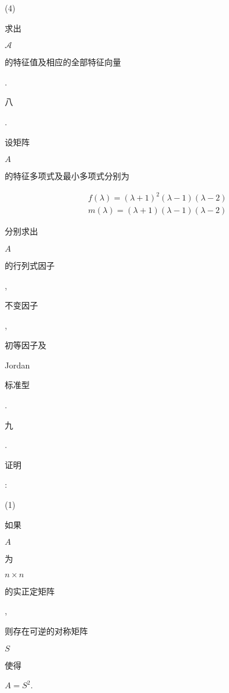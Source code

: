 \documentclass[10pt]{article}
\begin{document}
(4) \begin{CJK}{UTF8}{mj}求出\end{CJK} $\mathscr{A}$ \begin{CJK}{UTF8}{mj}的特征值及相应的全部特征向量\end{CJK}. \begin{CJK}{UTF8}{mj}八\end{CJK}. \begin{CJK}{UTF8}{mj}设矩阵\end{CJK} $A$ \begin{CJK}{UTF8}{mj}的特征多项式及最小多项式分别为\end{CJK}
$$
\begin{aligned}
&f(\lambda)=(\lambda+1)^{2}(\lambda-1)(\lambda-2) \\
&m(\lambda)=(\lambda+1)(\lambda-1)(\lambda-2)
\end{aligned}
$$
\begin{CJK}{UTF8}{mj}分别求出\end{CJK} $A$ \begin{CJK}{UTF8}{mj}的行列式因子\end{CJK}, \begin{CJK}{UTF8}{mj}不变因子\end{CJK}, \begin{CJK}{UTF8}{mj}初等因子及\end{CJK} Jordan \begin{CJK}{UTF8}{mj}标准型\end{CJK}.

\begin{CJK}{UTF8}{mj}九\end{CJK}. \begin{CJK}{UTF8}{mj}证明\end{CJK}:

(1) \begin{CJK}{UTF8}{mj}如果\end{CJK} $A$ \begin{CJK}{UTF8}{mj}为\end{CJK} $n \times n$ \begin{CJK}{UTF8}{mj}的实正定矩阵\end{CJK}, \begin{CJK}{UTF8}{mj}则存在可逆的对称矩阵\end{CJK} $S$ \begin{CJK}{UTF8}{mj}使得\end{CJK} $A=S^{2}$.
\end{document}
